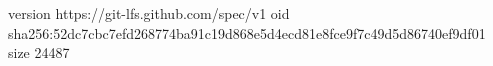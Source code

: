 version https://git-lfs.github.com/spec/v1
oid sha256:52dc7cbc7efd268774ba91c19d868e5d4ecd81e8fce9f7c49d5d86740ef9df01
size 24487
